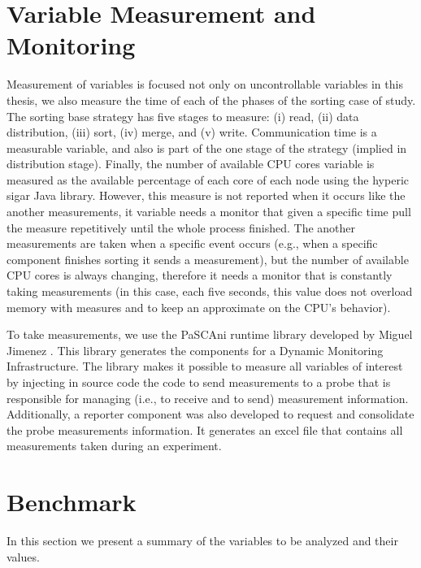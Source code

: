 \section{Variable Measurement and Monitoring}
\label{sec:measureandmonitor}
Measurement of variables is focused not only on uncontrollable variables in this thesis, we also measure the time of each of the phases of the sorting case of study. The sorting base strategy has five stages to measure: (i) read, (ii) data distribution, (iii) sort, (iv) merge, and (v) write. Communication time is a measurable variable, and also is part of the one stage of the strategy (implied in distribution stage). Finally, the number of available CPU cores variable is measured as the available percentage of each core of each node using the hyperic sigar Java library. However, this measure is not reported when it occurs like the another measurements, it variable needs a monitor that given a specific time pull the measure repetitively until the whole process finished. The another measurements are taken when a specific event occurs (e.g., when a specific component finishes sorting it sends a measurement), but the number of available CPU cores is always changing, therefore it needs a monitor that is constantly taking measurements (in this case, each five seconds, this value does not overload memory with measures and to keep an approximate on the CPU's behavior).

To take measurements, we use the PaSCAni runtime library developed by Miguel Jimenez \cite{6976605}. This library generates the components for a Dynamic Monitoring Infrastructure. The library makes it possible to measure all variables of interest by injecting in source code the code to send measurements to a probe that is responsible for managing (i.e., to receive and to send) measurement information. Additionally, a reporter component was also developed to request and consolidate the probe measurements information. It generates an excel file that contains all measurements taken during an experiment.

\section{Benchmark}
\label{sec:benchmark}
In this section we present a summary of the variables to be analyzed and their values.

